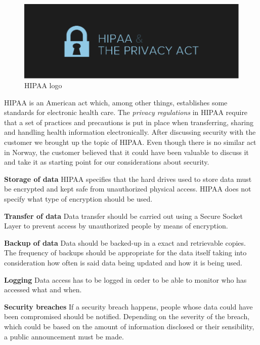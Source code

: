 \begin{figure}[h]
\centering
\includegraphics[scale=0.50]{../Figures/hipaa2.png}
\caption{HIPAA logo}
\label{figure:HIPAA}
\end{figure}

HIPAA\cite{HIPAA} is an American act which, among other things, establishes some standards
for electronic health care. The \textit{privacy regulations} in HIPAA require
that a set of practices and precautions is put in place when transferring, sharing
and handling health information electronically.
After discussing security with the customer we brought up the topic of HIPAA.
Even though there is no similar act in Norway, the customer believed that it could have been
valuable to discuss it and take it as starting point for our considerations about security. 

\textbf{Storage of data}\newline
HIPAA specifies that the hard drives used to store data must be encrypted and
kept safe from unauthorized physical access. HIPAA does not specify what type
of encryption should be used.

\textbf{Transfer of data}\newline
Data transfer should be carried out using a Secure Socket Layer\cite{SSL}
to prevent access by unauthorized people by means of encryption.

\textbf{Backup of data}\newline
Data should be backed-up in a exact and retrievable copies.
The frequency of backups should be appropriate for the data itself
taking into consideration how often is said data being updated and how it is being
used.

\textbf{Logging}\newline
Data access has to be logged in order to be able to monitor who
has accessed what and when.

\textbf{Security breaches}\newline
If a security breach happens, people whose data could have been compromised
should be notified. Depending on the severity of the breach, which could be
based on the amount of information disclosed or their sensibility,
a public announcement must be made.

